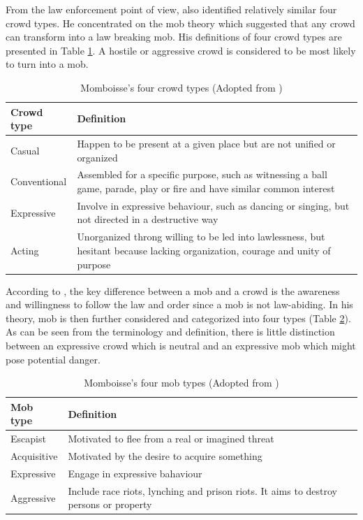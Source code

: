 From the law enforcement point of view, \textcite{Momboisse1967} also identified relatively similar four crowd types. He concentrated on the mob theory which suggested that any crowd can transform into a law breaking mob. His definitions of four crowd types are presented in Table \ref{table:momboisseCrowdType}. A hostile or aggressive crowd is considered to be most likely to turn into a mob.

\begin{table}[!htbp]
	\caption{Momboisse's four crowd types (Adopted from \textcite{Schweingruber2000})}
	\label{table:momboisseCrowdType}
	\centering
	\begin{tabular}{|l|p{10cm}|}
		\hline
		\textbf{Crowd type} & \textbf{Definition} \\ \hline \hline
		Casual & Happen to be present at a given place but are not unified or organized \\ \hline
		Conventional & Assembled for a specific purpose, such as witnessing a ball game, parade, play or fire 
		and have similar common interest \\ \hline
		Expressive & Involve in expressive behaviour, such as dancing or singing, but not directed in a destructive way \\ \hline
		Acting & Unorganized throng willing to be led into lawlessness, but hesitant because lacking organization, courage and unity of purpose \\ \hline
	\end{tabular}
\end{table}


According to \textcite{Momboisse1967}, the key difference between a mob and a crowd is the awareness and willingness to follow the law and order since a mob is not law-abiding. In his theory, mob is then further considered and categorized into four types (Table \ref{table:momboisseMobType}). As can be seen from the terminology and definition, there is little distinction between an expressive crowd which is neutral and an expressive mob which might pose potential danger.

\begin{table}
	\caption{Momboisse's four mob types (Adopted from \textcite{Schweingruber2000})}
	\label{table:momboisseMobType}
	\centering
	\begin{tabular}{|l|p{10cm}|}
		\hline
		\textbf{Mob type} & \textbf{Definition} \\ \hline \hline
		Escapist & Motivated to flee from a real or imagined threat \\ \hline
		Acquisitive &  Motivated by the desire to acquire something \\ \hline
		Expressive & Engage in expressive bahaviour \\ \hline
		Aggressive & Include race riots, lynching and prison riots. It aims to destroy persons or property \\ \hline
	\end{tabular}
\end{table}


